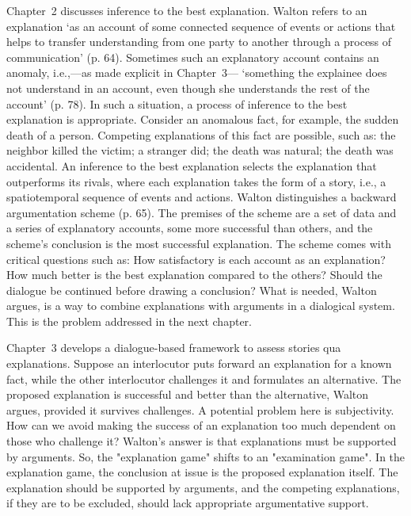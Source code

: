 \documentclass[12pt]{article}
\begin{document}
Chapter~2 discusses inference to the best explanation. Walton refers to an explanation `as an account of some connected sequence of events or actions that helps to transfer understanding from one party to another through a process of communication' (p. 64). Sometimes such an explanatory account contains an anomaly, i.e.,---as made explicit in Chapter~3--- `something the explainee does not understand in an account, even though she understands the rest of the account' (p. 78). In such a situation, a process of inference to the best explanation is appropriate. Consider an
anomalous fact, for example, the sudden death of a person. Competing
explanations of this fact are possible, such as: the neighbor killed
the victim; a stranger did; the death was natural; the death was
accidental. An inference to the best explanation selects the
explanation that outperforms its rivals, where each explanation takes
the form of a story, i.e., a spatiotemporal sequence of events and actions.
Walton distinguishes a backward argumentation scheme (p. 65). The premises of the scheme are a set of data and a series of explanatory accounts, some more successful than others, and the scheme's conclusion is the most successful explanation. The scheme comes with critical questions such as: How satisfactory is each account as an explanation? How much better is the best explanation compared to the others? Should the dialogue be continued before drawing a conclusion?   
What is needed,
Walton argues, is a way to combine explanations with arguments in a dialogical system. This
is the problem addressed in the next chapter.

Chapter~3 develops a dialogue-based framework to assess stories qua
explanations. Suppose an interlocutor puts forward an explanation for
a known fact, while the other interlocutor challenges it and
formulates an alternative. The proposed explanation is successful and
better than the alternative, Walton argues, provided it survives
challenges. A potential problem here is subjectivity. How can we avoid
making the success of an explanation too much dependent on those who
challenge it? Walton's answer is that explanations must be supported
by arguments. So, the "explanation game" shifts to an 
"examination game". In the explanation game, the conclusion at issue
is the proposed explanation itself. The explanation should be
supported by arguments, and the competing explanations, if they are to
be excluded, should lack appropriate argumentative support.
\end{document}
